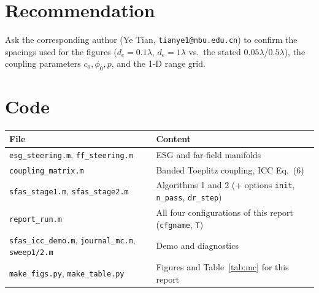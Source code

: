 \documentclass[11pt,a4paper]{article}
\newcommand{\dc}{d_c}\newcommand{\de}{d_e}
\begin{document}
\section{Recommendation}
Ask the corresponding author (Ye Tian, \texttt{tianye1@nbu.edu.cn}) to confirm the spacings used for the figures
($\dc=0.1\lambda$, $\de=1\lambda$ vs.\ the stated $0.05\lambda$/$0.5\lambda$), the coupling parameters $c_0,\phi_0,p$,
and the 1-D range grid.

\appendix
\section{Code}
{\small\begin{tabular}{@{}p{6.6cm}p{9cm}@{}}\toprule
File & Content \\\midrule
\texttt{esg\_steering.m}, \texttt{ff\_steering.m} & ESG and far-field manifolds \\
\texttt{coupling\_matrix.m} & Banded Toeplitz coupling, ICC Eq.~(6) \\
\texttt{sfas\_stage1.m}, \texttt{sfas\_stage2.m} & Algorithms 1 and 2 (+ options \texttt{init}, \texttt{n\_pass}, \texttt{dr\_step}) \\
\texttt{report\_run.m} & All four configurations of this report (\texttt{cfgname}, \texttt{T}) \\
\texttt{sfas\_icc\_demo.m}, \texttt{journal\_mc.m}, \texttt{sweep1/2.m} & Demo and diagnostics \\
\texttt{make\_figs.py}, \texttt{make\_table.py} & Figures and Table~\ref{tab:mc} for this report \\\bottomrule
\end{tabular}}
\end{document}
